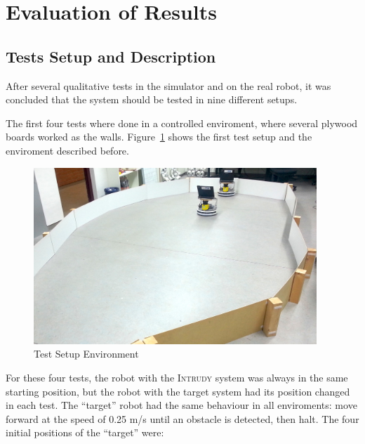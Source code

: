 \documentclass[12pt,a4paper]{scrartcl}
\newcommand{\intrudy}{\textsc{Intrudy}\xspace}
\begin{document}

\newpage

\section{Evaluation of Results} %
\label{sec:evaluation_of_results}

	\subsection{Tests Setup and Description} %
	\label{sub:tests_setup_and_description}

	After several qualitative tests in the simulator and on the real robot, it was concluded that the system should be tested in nine different setups. 

	The first four tests where done in a controlled enviroment, where several plywood boards worked as the walls. Figure~\ref{fig:test_setup} shows the first test setup and the enviroment described before.
	
	\begin{figure}[htc]
		\center
		\includegraphics[width=0.95\textwidth]{img/test_setup.jpg}
		\caption{Test Setup Environment}
			\label{fig:test_setup}
	\end{figure}

	For these four tests, the robot with the \intrudy system was always in the same starting position, but the robot with the target system had its position changed in each test. The ``target'' robot had the same behaviour in all enviroments: move forward at the speed of 0.25 m/s until an obstacle is detected, then halt. The four initial positions of the ``target'' were:
\end{document}
